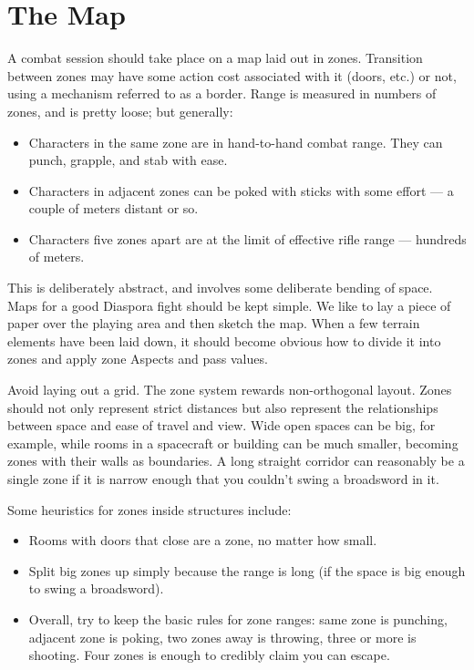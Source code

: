 \section{The Map}
\label{sec:personal-combat-map}

A combat session should take place on a map laid out in zones. Transition between zones may have some action cost associated with it (doors, etc.) or not, using a mechanism referred to as a border. Range is measured in numbers of zones, and is pretty loose; but generally:

\begin{itemize}
\item Characters in the same zone are in hand-to-hand combat range. They can punch, grapple, and stab with ease.
\item Characters in adjacent zones can be poked with sticks with some effort --- a couple of meters distant or so.
\item Characters five zones apart are at the limit of effective rifle range --- hundreds of meters.
\end{itemize}

This is deliberately abstract, and involves some deliberate bending of space. Maps for a good Diaspora fight should be kept simple. We like to lay a piece of paper over the playing area and then sketch the map. When a few terrain elements have been laid down, it should become obvious how to divide it into zones and apply zone Aspects and pass values.

Avoid laying out a grid. The zone system rewards non-orthogonal layout. Zones should not only represent strict distances but also represent the relationships between space and ease of travel and view. Wide open spaces can be big, for example, while rooms in a spacecraft or building can be much smaller, becoming zones with their walls as boundaries. A long straight corridor can reasonably be a single zone if it is narrow enough that you couldn't swing a broadsword in it.

Some heuristics for zones inside structures include:

\begin{itemize}
\item Rooms with doors that close are a zone, no matter how small.
\item Split big zones up simply because the range is long (if the space is big enough to swing a broadsword).
\item Overall, try to keep the basic rules for zone ranges: same zone is punching, adjacent zone is poking, two zones away is throwing, three or more is shooting. Four zones is enough to credibly claim you can escape.
\end{itemize}

